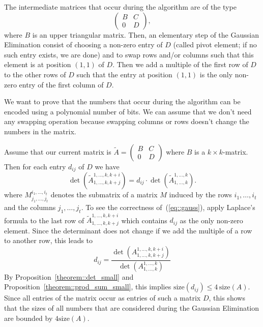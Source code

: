 \documentclass[12pt, showidx, twoside]{article}
\begin{document}
{{{The intermediate matrices that occur during the algorithm are of 
the type 
\begin{equation}
   \left(
      \begin{array}{cc}
          B & C \\
          0 & D 
      \end{array}
   \right),
\end{equation}
where $B$ is an upper triangular matrix.
Then, an elementary step of the Gaussian Elimination consist
of choosing a non-zero entry of $D$ (called pivot element;
if no such entry exists, we are done) 
and to swap rows and/or columns such that this element is at
position $(1,1)$ of $D$. Then we add a multiple of the 
first row of $D$ to the other rows of $D$ such that the
entry at position $(1,1)$ is the only non-zero entry of the
first column of $D$.

We want to prove that the numbers that occur during the algorithm
can be encoded using a polynomial number of bits. We can assume
that we don't need any swapping operation because swapping columns
or rows doesn't change the numbers in the matrix.


Assume that our current matrix is 
$\tilde A = \left(
      \begin{array}{cc}
          B & C \\
          0 & D 
      \end{array}
   \right)$ where $B$ is a $k \times k$-matrix.
Then for each entry $d_{ij}$ of $D$ we have
\begin{equation}\label{eq::gauss}
   \det(\tilde A^{1,\dots,k,k+i}_{1,\dots,k,k+j}) = d_{ij} \cdot \det(\tilde A^{1,\dots,k}_{1,\dots,k}).
\end{equation}
where $M^{i_1,\dots,i_t}_{j_1,\dots,j_t}$ denotes the submatrix of a matrix $M$
induced by the rows $i_1,\dots,i_t$ and the columns ${j_1,\dots,j_t}$.
To see the correctness of~(\ref{eq::gauss}), apply Laplace's formula
to the last row of $\tilde A^{1,\dots,k,k+i}_{1,\dots,k,k+j}$ which contains
$d_{ij}$ as the only non-zero element.
Since the 
determinant does not change if we add the multiple of 
a row to another row, this leads to
\begin{equation*}
d_{ij}  =  \frac{\det(A^{1,\dots,k,k+i}_{1,\dots,k,k+j})}
             {\det(A^{1,\dots,k}_{1,\dots,k})} 
\end{equation*}
By Proposition~\ref{theorem::det_small} and
Proposition~\ref{theorem::prod_sum_small},
this implies $\text{size}(d_{ij}) \leq 4 \, \text{size}(A)$. 
Since all entries of the matrix occur as entries of such a 
matrix $D$, this shows that the sizes of all numbers 
that are considered during the Gaussian Elimination
are bounded by $ 4 \text{size}(A)$. 

}}}
\end{document}
